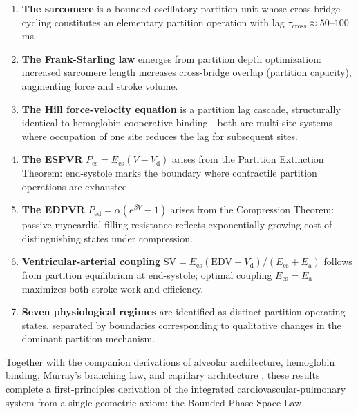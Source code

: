 \documentclass[10pt,twocolumn,a4paper]{article}
\theoremstyle{remark}
\newcommand{\taucross}{\tau_{\mathrm{cross}}}
\newcommand{\Ees}{E_{\mathrm{es}}}
\newcommand{\Ea}{E_{\mathrm{a}}}
\newcommand{\Vd}{V_{\mathrm{d}}}
\newcommand{\Pes}{P_{\mathrm{es}}}
\newcommand{\Ped}{P_{\mathrm{ed}}}
\newcommand{\SV}{\mathrm{SV}}
\newcommand{\EDV}{\mathrm{EDV}}
\begin{document}
\begin{enumerate}
    \item \textbf{The sarcomere} is a bounded oscillatory partition unit whose cross-bridge cycling constitutes an elementary partition operation with lag $\taucross \approx 50$--$100$ ms.

    \item \textbf{The Frank-Starling law} emerges from partition depth optimization: increased sarcomere length increases cross-bridge overlap (partition capacity), augmenting force and stroke volume.

    \item \textbf{The Hill force-velocity equation} is a partition lag cascade, structurally identical to hemoglobin cooperative binding—both are multi-site systems where occupation of one site reduces the lag for subsequent sites.

    \item \textbf{The ESPVR} $\Pes = \Ees(V - \Vd)$ arises from the Partition Extinction Theorem: end-systole marks the boundary where contractile partition operations are exhausted.

    \item \textbf{The EDPVR} $\Ped = \alpha(e^{\beta V} - 1)$ arises from the Compression Theorem: passive myocardial filling resistance reflects exponentially growing cost of distinguishing states under compression.

    \item \textbf{Ventricular-arterial coupling} $\SV = \Ees(\EDV - \Vd)/(\Ees + \Ea)$ follows from partition equilibrium at end-systole; optimal coupling $\Ees = \Ea$ maximizes both stroke work and efficiency.

    \item \textbf{Seven physiological regimes} are identified as distinct partition operating states, separated by boundaries corresponding to qualitative changes in the dominant partition mechanism.
\end{enumerate}

Together with the companion derivations of alveolar architecture, hemoglobin binding, Murray's branching law, and capillary architecture \cite{sachikonye2024cardio}, these results complete a first-principles derivation of the integrated cardiovascular-pulmonary system from a single geometric axiom: the Bounded Phase Space Law.



\end{document}
